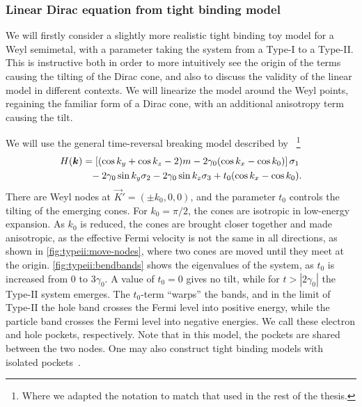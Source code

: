 \subsubsection{Linear Dirac equation from tight binding model}
\label{sec:tilt:tightbindingmodel}
We will firstly consider a slightly more realistic tight binding toy model for a Weyl semimetal, with a parameter taking the system from a Type-I to a Type-II.
This is instructive both in order to more intuitively see the origin of the terms causing the tilting of the Dirac cone, and also to discuss the validity of the linear model in different contexts.
We will linearize the model around the Weyl points, regaining the familiar form of a Dirac cone, with an additional anisotropy term causing the tilt.

We will use the general time-reversal breaking model described by~\textcite{mccormickMinimalModelsTopological2017}%
\footnote{Where we adapted the notation to match that used in the rest of the thesis.}
\begin{equation}
  \begin{split}
    H(\vec{k}) &= \left[ ( \cos k_y + \cos k_z - 2 )m - 2 \gamma_0 (\cos k_x - \cos k_0) \right] \sigma_1\\
    &\pe - 2 \gamma_0 \sin k_y \sigma_2 - 2 \gamma_{0} \sin k_z \sigma_3
    + t_0 (\cos k_x - \cos k_0).
  \end{split}
\end{equation}
There are Weyl nodes at \(\vec{K}' = (\pm k_{0}, 0,0)\), and the parameter $t_0$ controls the tilting of the emerging cones.
For \( k_0 = \pi /2 \), the cones are isotropic in low-energy expansion.
As \( k_0 \) is reduced, the cones are brought closer together and made anisotropic, as the effective Fermi velocity is not the same in all directions, as shown in \cref{fig:typeii:move-nodes}, where two cones are moved until they meet at the origin.
\cref{fig:typeii:bendbands} shows the eigenvalues of the system, as \( t_0 \) is increased from 0 to \( 3 \gamma_0 \).
A value of $t_{0}=0$ gives no tilt, while for $t > |2 \gamma_0| $ the Type-II system emerges.
The \( t_0 \)-term ``warps'' the bands, and in the limit of Type-II the hole band crosses the Fermi level into positive energy, while the particle band crosses the Fermi level into negative energies.
We call these electron and hole pockets, respectively.
Note that in this model, the pockets are shared between the two nodes.
One may also construct tight binding models with isolated pockets~\cite{mccormickMinimalModelsTopological2017}.

